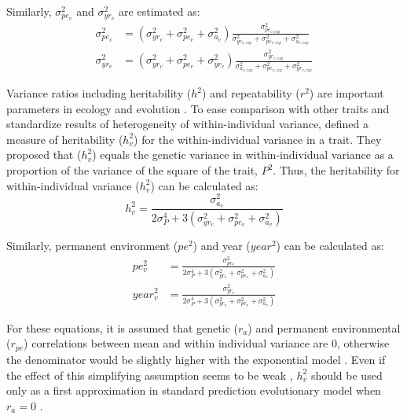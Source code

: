 \documentclass[a4paper,12pt,twoside]{article}
\begin{document}
	Similarly, $\sigma_{pe_v}^2$ and $\sigma_{yr_v}^2$ are estimated as:
	\begin{align}
		\sigma_{pe_v}^2 &= (\sigma_{yr_v}^2 + \sigma_{pe_v}^2 + \sigma_{a_v}^2 ) \frac{\sigma_{pe_{v,exp}}^2}{\sigma_{yr_{v,exp}}^2 + \sigma_{pe_{v,exp}}^2 + \sigma_{a_{v,exp}}^2}\\
		\sigma_{yr_v}^2 &= (\sigma_{yr_v}^2 + \sigma_{pe_v}^2 + \sigma_{yr_v}^2 ) \frac{\sigma_{yr_{v,exp}}^2}{\sigma_{a_{v,exp}}^2 + \sigma_{pe_{v,exp}}^2 + \sigma_{yr_{v,exp}}^2}
	\end{align}
	
	Variance ratios including heritability ($h^2$) and repeatability ($r^2$) are important parameters in ecology and evolution \citep{Lynch1998, Roff2002}. 
	To ease comparison with other traits and standardize results of heterogeneity of within-individual variance, \cite{Mulder2007} defined a measure of heritability ($h_v^2$) for the within-individual variance in a trait.
	They proposed that ($h_v^2$) equals the genetic variance in within-individual variance as a proportion of the variance of the square of the trait, $P^2$.
	Thus, the heritability for within-individual variance ($h_v^2$) can be calculated as:
	\begin{equation}
		h_v^2 = \frac{\sigma_{a_v}^2}{2\sigma_P^4+3(\sigma_{yr_v}^2+ \sigma_{pe_v}^2 + \sigma_{a_v}^2)}
	\end{equation}
	
	Similarly, permanent environment ($pe^2$) and year ($year^2$) can be calculated as:
	\begin{align}
		pe_v^2 &= \frac{\sigma_{pe_v}^2}{2\sigma_P^4+3(\sigma_{yr_v}^2+ \sigma_{pe_v}^2 + \sigma_{a_v}^2)}\\
		year_v^2 &= \frac{\sigma_{yr_v}^2}{2\sigma_P^4+3(\sigma_{yr_v}^2+ \sigma_{pe_v}^2 + \sigma_{a_v}^2)}
	\end{align}
	
	For these equations, it is assumed that genetic ($r_a$) and permanent environmental ($r_{pe}$) correlations between mean and within individual variance are 0, otherwise the denominator would be slightly higher with the exponential model \citep{Mulder2007}.
	Even if the effect of this simplifying assumption seems to be weak \citep{Mulder2007, Sae-lim2015}, $h_v^2$ should be used only as a first approximation in standard prediction evolutionary model when $r_a=0$ .

	
\end{document}

